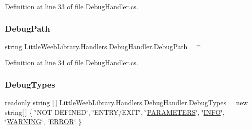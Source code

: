 Definition at line 33 of file Debug\+Handler.\+cs.

\mbox{\label{class_little_weeb_library_1_1_handlers_1_1_debug_handler_ac3da0e592d7c056dfeb8e60a5a5c1986}} 
\subsubsection{\texorpdfstring{Debug\+Path}{DebugPath}}
{\footnotesize\ttfamily string Little\+Weeb\+Library.\+Handlers.\+Debug\+Handler.\+Debug\+Path = \char`\"{}\char`\"{}\hspace{0.3cm}{\ttfamily [private]}}



Definition at line 34 of file Debug\+Handler.\+cs.

\mbox{\label{class_little_weeb_library_1_1_handlers_1_1_debug_handler_a99de78cea15e565e6c5c819b7230e57b}} 
\subsubsection{\texorpdfstring{Debug\+Types}{DebugTypes}}
{\footnotesize\ttfamily readonly string \mbox{[}$\,$\mbox{]} Little\+Weeb\+Library.\+Handlers.\+Debug\+Handler.\+Debug\+Types = new string\mbox{[}$\,$\mbox{]} \{ \char`\"{}N\+OT D\+E\+F\+I\+N\+ED\char`\"{}, \char`\"{}E\+N\+T\+RY/E\+X\+IT\char`\"{}, \char`\"{}\mbox{\hyperlink{namespace_little_weeb_library_1_1_handlers_ab66019ed40462876ec4e61bb3ccb0a62aeb178264802ebbd52cccc8feadb72a6f}{P\+A\+R\+A\+M\+E\+T\+E\+RS}}\char`\"{}, \char`\"{}\mbox{\hyperlink{namespace_little_weeb_library_1_1_handlers_ab66019ed40462876ec4e61bb3ccb0a62a551b723eafd6a31d444fcb2f5920fbd3}{I\+N\+FO}}\char`\"{}, \char`\"{}\mbox{\hyperlink{namespace_little_weeb_library_1_1_handlers_ab66019ed40462876ec4e61bb3ccb0a62a059e9861e0400dfbe05c98a841f3f96b}{W\+A\+R\+N\+I\+NG}}\char`\"{}, \char`\"{}\mbox{\hyperlink{namespace_little_weeb_library_1_1_handlers_ab66019ed40462876ec4e61bb3ccb0a62abb1ca97ec761fc37101737ba0aa2e7c5}{E\+R\+R\+OR}}\char`\"{} \}\hspace{0.3cm}{\ttfamily [private]}}



